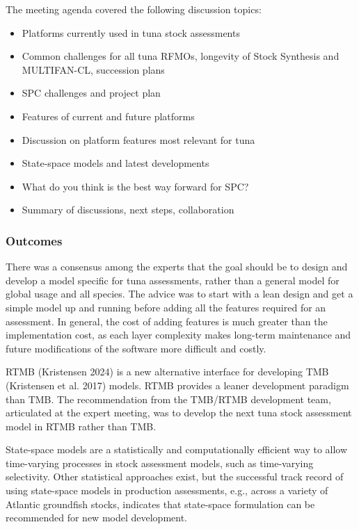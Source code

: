 \documentclass{SCreport}
\begin{document}
The meeting agenda covered the following discussion topics:

\begin{itemize}
  \item Platforms currently used in tuna stock assessments\\[-4ex]
  \item Common challenges for all tuna RFMOs, longevity of Stock Synthesis and
  MULTIFAN-CL, succession plans\\[-4ex]
  \item SPC challenges and project plan\\[-4ex]
  \item Features of current and future platforms\\[-4ex]
  \item Discussion on platform features most relevant for tuna\\[-4ex]
  \item State-space models and latest developments\\[-4ex]
  \item What do you think is the best way forward for SPC?\\[-4ex]
  \item Summary of discussions, next steps, collaboration
\end{itemize}

\subsubsection{Outcomes}

There was a consensus among the experts that the goal should be to design and
develop a model specific for tuna assessments, rather than a general model for
global usage and all species. The advice was to start with a lean design and get
a simple model up and running before adding all the features required for an
assessment. In general, the cost of adding features is much greater than the
implementation cost, as each layer complexity makes long-term maintenance and
future modifications of the software more difficult and costly.

RTMB (Kristensen 2024) is a new alternative interface for developing TMB
(Kristensen et al. 2017) models. RTMB provides a leaner development paradigm
than TMB. The recommendation from the TMB/RTMB development team, articulated at
the expert meeting, was to develop the next tuna stock assessment model in RTMB
rather than TMB.

State-space models are a statistically and computationally efficient way to
allow time-varying processes in stock assessment models, such as time-varying
selectivity. Other statistical approaches exist, but the successful track record
of using state-space models in production assessments, e.g., across a variety of
Atlantic groundfish stocks, indicates that state-space formulation can be
recommended for new model development.
\end{document}
